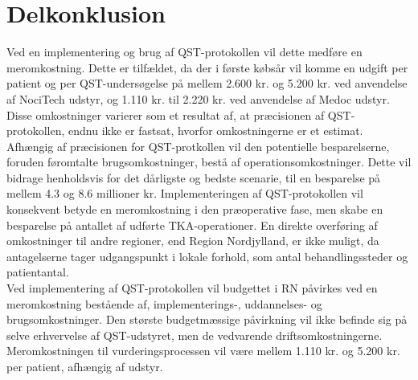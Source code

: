 \section{Delkonklusion}
Ved en implementering og brug af QST-protokollen vil dette medføre en meromkostning. Dette er tilfældet, da der i første købsår vil komme en udgift per patient og per QST-undersøgelse på mellem 2.600 kr. og 5.200 kr. ved anvendelse af NociTech udstyr, og 1.110 kr. til 2.220 kr. ved anvendelse af Medoc udstyr. Disse omkostninger varierer som et resultat af, at præcisionen af QST-protokollen, endnu ikke er fastsat, hvorfor omkostningerne er et estimat. Afhængig af præcisionen for QST-protkollen vil den potentielle besparelserne, foruden føromtalte brugsomkostninger, bestå af operationsomkostninger. Dette vil bidrage henholdsvis for det dårligste og bedste scenarie, til en besparelse på mellem 4.3 og 8.6 millioner kr.%
Implementeringen af QST-protokollen vil konsekvent betyde en meromkostning i den præoperative fase, men skabe en besparelse på antallet af udførte TKA-operationer. En direkte overføring af omkostninger til andre regioner, end Region Nordjylland, er ikke muligt, da antagelserne tager udgangspunkt i lokale forhold, som antal behandlingssteder og patientantal. \\
Ved implementering af QST-protokollen vil budgettet i RN påvirkes ved en meromkostning bestående af, implementerings-, uddannelses- og brugsomkostninger. Den største budgetmæssige påvirkning vil ikke befinde sig på selve erhvervelse af QST-udstyret, men de vedvarende driftsomkostningerne. Meromkostningen til vurderingsprocessen vil være mellem 1.110 kr. og 5.200 kr. per patient, afhængig af udstyr. 